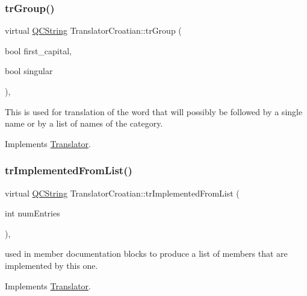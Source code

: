 \subsubsection{\texorpdfstring{trGroup()}{trGroup()}}
{\footnotesize\ttfamily virtual \mbox{\hyperlink{class_q_c_string}{Q\+C\+String}} Translator\+Croatian\+::tr\+Group (\begin{DoxyParamCaption}\item[{bool}]{first\+\_\+capital,  }\item[{bool}]{singular }\end{DoxyParamCaption})\hspace{0.3cm}{\ttfamily [inline]}, {\ttfamily [virtual]}}

This is used for translation of the word that will possibly be followed by a single name or by a list of names of the category. 

Implements \mbox{\hyperlink{class_translator}{Translator}}.

\mbox{\label{class_translator_croatian_a9387908f11cf090eceeb2da2665e1a35}} 
\subsubsection{\texorpdfstring{trImplementedFromList()}{trImplementedFromList()}}
{\footnotesize\ttfamily virtual \mbox{\hyperlink{class_q_c_string}{Q\+C\+String}} Translator\+Croatian\+::tr\+Implemented\+From\+List (\begin{DoxyParamCaption}\item[{int}]{num\+Entries }\end{DoxyParamCaption})\hspace{0.3cm}{\ttfamily [inline]}, {\ttfamily [virtual]}}

used in member documentation blocks to produce a list of members that are implemented by this one. 

Implements \mbox{\hyperlink{class_translator}{Translator}}.

\mbox{\label{class_translator_croatian_a51487cd62929b05a2fae49c8aadc4ffb}} 
